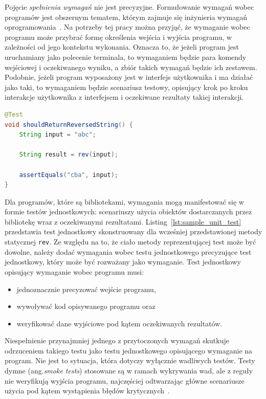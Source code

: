Pojęcie \textit{spełnienia wymagań} nie jest precyzyjne.
Formułowanie wymagań wobec programów jest obszernym tematem, którym zajmuje się inżynieria wymagań oprogramowania~\cite{macaulay2012requirements}.
Na potrzeby tej pracy można przyjąć, że wymaganie wobec programu może przybrać formę określenia wejścia i
wyjścia programu, w zależności od jego kontekstu wykonania.
Oznacza to, że jeżeli program jest uruchamiany jako polecenie terminala, to wymaganiem będzie para komendy
wejściowej i oczekiwanego wyniku, a zbiór takich wymagań będzie ich zestawem.
Podobnie, jeżeli program wyposażony jest w interfejs użytkownika i ma działać jako taki, to wymaganiem będzie
scenariusz testowy, opisujący krok po kroku interakcje użytkownika z interfejsem i oczekiwane rezultaty takiej
interakcji.

\begin{lstlisting}[language=Java,
    caption={Przykładowy test JUnit dla metody statycznej \texttt{rev}},
    label={lst:sample_unit_test}]
@Test
void shouldReturnReversedString() {
    String input = "abc";

    String result = rev(input);

    assertEquals("cba", input);
}
\end{lstlisting}

Dla programów, które są bibliotekami, wymagania mogą manifestować się w formie testów jednostkowych: scenariuszy
użycia obiektów dostarczanych przez bibliotekę wraz z oczekiwanymi rezultatami.
Listing~\ref{lst:sample_unit_test} przedstawia test jednostkowy skonstruowany dla wcześniej przedstawionej metody
statycznej \texttt{rev}.
Ze względu na to, że ciało metody reprezentującej test może być dowolne, należy dodać wymagania wobec testu
jednostkowego precyzujące test jednostkowy, który może być rozważany jako wymaganie.
Test jednostkowy opisujący wymaganie wobec programu musi:
\begin{itemize}
    \item jednoznacznie precyzować wejście programu,
    \item wywoływać kod opisywanego programu oraz
    \item weryfikować dane wyjściowe pod kątem oczekiwanych rezultatów.
\end{itemize}

Niespełnienie przynajmniej jednego z przytoczonych wymagań skutkuje odrzuceniem takiego testu jako testu jednostkowego
opisującego wymaganie na program.
Nie jest to sytuacja, która dotyczy wyłącznie wadliwych testów.
Testy dymne (ang.\@ \textit{smoke tests}) stosowane są w ramach wykrywania wad, ale z reguły nie weryfikują wyjścia
programu, najczęściej odtwarzając główne scenariusze użycia pod kątem wystąpienia błędów krytycznych~\cite{chauhan2014smoke}.

